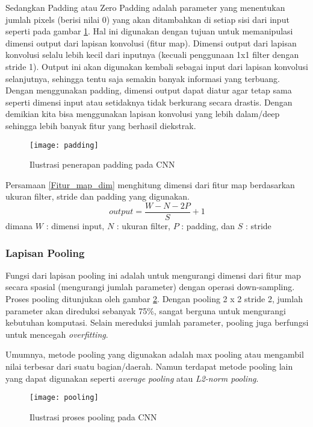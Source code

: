 \documentclass[../thesis.tex]{subfiles}
\begin{document}
Sedangkan Padding atau Zero Padding adalah parameter yang menentukan jumlah pixels (berisi nilai 0) yang akan ditambahkan di setiap sisi dari input seperti pada gambar \ref{padding_CNN}. Hal ini digunakan dengan tujuan untuk memanipulasi dimensi output dari lapisan konvolusi (fitur map).
Dimensi output dari lapisan konvolusi selalu lebih kecil dari inputnya (kecuali penggunaan 1x1 filter dengan stride 1). Output ini akan digunakan kembali sebagai input dari lapisan konvolusi selanjutnya, sehingga tentu saja semakin banyak informasi yang terbuang.
Dengan menggunakan padding, dimensi output dapat diatur agar tetap sama seperti dimensi input atau setidaknya tidak berkurang secara drastis. Dengan demikian kita bisa menggunakan lapisan konvolusi yang lebih dalam/deep sehingga lebih banyak fitur yang berhasil diekstrak.

\begin{figure}
	\centering
	\texttt{[image: padding]}
	\caption{Ilustrasi penerapan padding pada CNN}
	\label{padding_CNN}
\end{figure}

Persamaan \ref{Fitur_map_dim} menghitung dimensi dari fitur map berdasarkan ukuran filter, stride dan padding yang digunakan.
\begin{equation}\label{Fitur_map_dim}
	output =\frac {W-N-2P}{S}+1
\end{equation}
dimana $W$ : dimensi input, $N$ : ukuran filter, $P$ : padding, dan $S$ : stride


\subsubsection{Lapisan Pooling}
Fungsi dari lapisan pooling ini adalah untuk mengurangi dimensi dari fitur map secara spasial (mengurangi jumlah
parameter) dengan operasi down-sampling. Proses pooling ditunjukan oleh gambar \ref{pooling_CNN}. Dengan pooling 2 x 2 stride 2, jumlah parameter akan direduksi sebanyak 75\%, sangat berguna untuk mengurangi kebutuhan komputasi. Selain
mereduksi jumlah parameter, pooling juga berfungsi untuk mencegah \textit{overfitting}.

Umumnya, metode pooling yang digunakan adalah max pooling atau mengambil nilai terbesar dari suatu bagian/daerah. Namun terdapat metode pooling lain yang dapat digunakan seperti \textit{average pooling} atau
\textit{L2-norm pooling}.
\begin{figure}[b]
	\centering
	\texttt{[image: pooling]}
	\caption{Ilustrasi proses pooling pada CNN}
	\label{pooling_CNN}
\end{figure}
\end{document}
